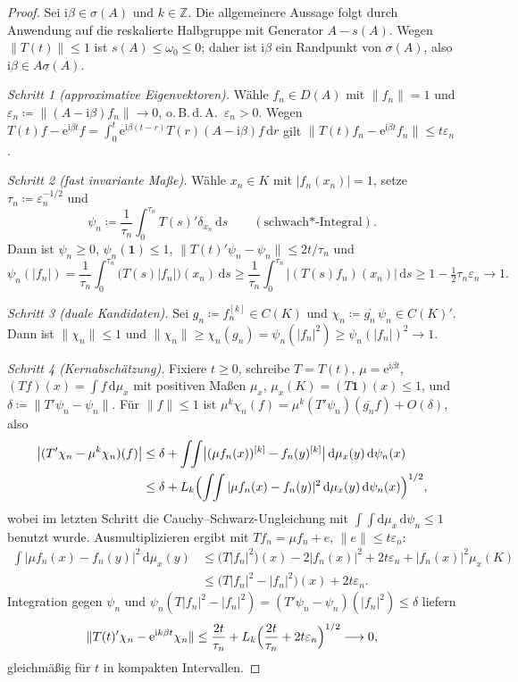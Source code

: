 \documentclass[11pt,a4paper]{article}
\theoremstyle{remark}
\theoremstyle{definition}
\newcommand{\Z}{\mathbb{Z}}
\newcommand{\eu}{\mathrm{e}}
\newcommand{\im}{\mathrm{i}}
\begin{document}
\begin{proof}
Sei $\im\beta \in \sigma(A)$ und $k \in \Z$.
Die allgemeinere Aussage folgt durch Anwendung auf die reskalierte Halbgruppe mit Generator $A - s(A)$.
Wegen $\|T(t)\| \le 1$ ist $s(A) \le \omega_0 \le 0$; daher ist $\im\beta$ ein Randpunkt von $\sigma(A)$, also $\im\beta \in A\sigma(A)$.

\emph{Schritt 1 (approximative Eigenvektoren).}
Wähle $f_n \in D(A)$ mit $\|f_n\| = 1$ und $\varepsilon_n \coloneqq \|(A - \im\beta)f_n\| \to 0$, o.\,B.\,d.\,A.\ $\varepsilon_n > 0$.
Wegen $T(t)f - \eu^{\im\beta t}f = \int_0^t \eu^{\im\beta(t-r)}T(r)(A - \im\beta)f \,\mathrm{d}r$ gilt $\|T(t)f_n - \eu^{\im\beta t}f_n\| \le t\varepsilon_n$.

\emph{Schritt 2 (fast invariante Maße).}
Wähle $x_n \in K$ mit $|f_n(x_n)| = 1$, setze $\tau_n \coloneqq \varepsilon_n^{-1/2}$ und
\[
  \psi_n \coloneqq \frac{1}{\tau_n}\int_0^{\tau_n} T(s)'\delta_{x_n} \,\mathrm{d}s \qquad (\text{schwach*-Integral}).
\]
Dann ist $\psi_n \ge 0$, $\psi_n(\mathbf{1}) \le 1$, $\|T(t)'\psi_n - \psi_n\| \le 2t/\tau_n$ und
\[
  \psi_n(|f_n|) = \frac{1}{\tau_n}\int_0^{\tau_n} \bigl(T(s)|f_n|\bigr)(x_n)\,\mathrm{d}s
  \ge \frac{1}{\tau_n}\int_0^{\tau_n} \bigl|(T(s)f_n)(x_n)\bigr|\,\mathrm{d}s
  \ge 1 - \tfrac{1}{2}\tau_n\varepsilon_n \longrightarrow 1 .
\]

\emph{Schritt 3 (duale Kandidaten).}
Sei $g_n \coloneqq f_n^{[k]} \in C(K)$ und $\chi_n \coloneqq \overline{g_n}\,\psi_n \in C(K)'$.
Dann ist $\|\chi_n\| \le 1$ und $\|\chi_n\| \ge \chi_n(g_n) = \psi_n(|f_n|^2) \ge \psi_n(|f_n|)^2 \to 1$.

\emph{Schritt 4 (Kernabschätzung).}
Fixiere $t \ge 0$, schreibe $T = T(t)$, $\mu = \eu^{\im\beta t}$, $(Tf)(x) = \int f\,\mathrm{d}\mu_x$ mit positiven Maßen $\mu_x$, $\mu_x(K) = (T\mathbf{1})(x) \le 1$, und $\delta \coloneqq \|T'\psi_n - \psi_n\|$.
Für $\|f\| \le 1$ ist $\mu^k\chi_n(f) = \mu^k (T'\psi_n)(\overline{g_n}f) + O(\delta)$, also
\begin{align*}
  \bigl|(T'\chi_n - \mu^k\chi_n)(f)\bigr|
  &\le \delta + \int\!\!\int \bigl|(\mu f_n(x))^{[k]} - f_n(y)^{[k]}\bigr| \,\mathrm{d}\mu_x(y)\,\mathrm{d}\psi_n(x) \\
  &\le \delta + L_k \Bigl(\int\!\!\int |\mu f_n(x) - f_n(y)|^2 \,\mathrm{d}\mu_x(y)\,\mathrm{d}\psi_n(x)\Bigr)^{1/2},
\end{align*}
wobei im letzten Schritt die Cauchy--Schwarz-Ungleichung mit $\int\!\!\int \mathrm{d}\mu_x\,\mathrm{d}\psi_n \le 1$ benutzt wurde.
Ausmultiplizieren ergibt mit $Tf_n = \mu f_n + e$, $\|e\| \le t\varepsilon_n$:
\begin{align*}
  \int |\mu f_n(x) - f_n(y)|^2 \,\mathrm{d}\mu_x(y)
  &\le \bigl(T|f_n|^2\bigr)(x) - 2|f_n(x)|^2 + 2t\varepsilon_n + |f_n(x)|^2 \mu_x(K) \\
  &\le \bigl(T|f_n|^2 - |f_n|^2\bigr)(x) + 2t\varepsilon_n .
\end{align*}
Integration gegen $\psi_n$ und $\psi_n(T|f_n|^2 - |f_n|^2) = (T'\psi_n - \psi_n)(|f_n|^2) \le \delta$ liefern
\[
  \|T(t)'\chi_n - \eu^{\im k\beta t}\chi_n\| \le \frac{2t}{\tau_n} + L_k\Bigl(\frac{2t}{\tau_n} + 2t\varepsilon_n\Bigr)^{1/2} \longrightarrow 0,
\]
gleichmäßig für $t$ in kompakten Intervallen.


\end{proof}
\end{document}

